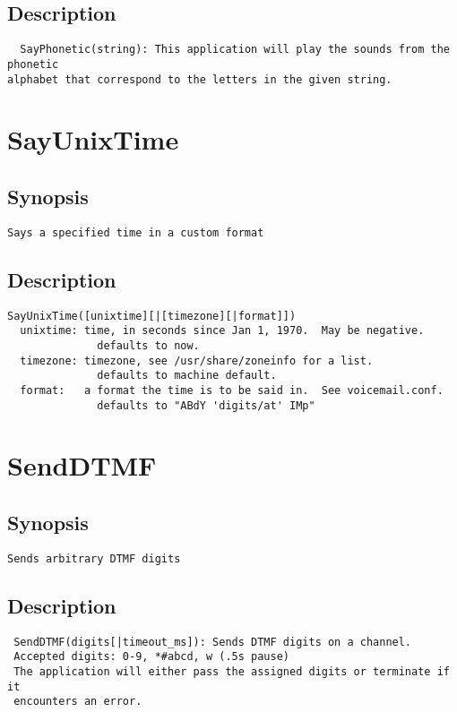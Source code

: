\subsection{Description}
\begin{verbatim}
  SayPhonetic(string): This application will play the sounds from the phonetic
alphabet that correspond to the letters in the given string.

\end{verbatim}


\section{SayUnixTime}
\subsection{Synopsis}
\begin{verbatim}
Says a specified time in a custom format
\end{verbatim}
\subsection{Description}
\begin{verbatim}
SayUnixTime([unixtime][|[timezone][|format]])
  unixtime: time, in seconds since Jan 1, 1970.  May be negative.
              defaults to now.
  timezone: timezone, see /usr/share/zoneinfo for a list.
              defaults to machine default.
  format:   a format the time is to be said in.  See voicemail.conf.
              defaults to "ABdY 'digits/at' IMp"

\end{verbatim}


\section{SendDTMF}
\subsection{Synopsis}
\begin{verbatim}
Sends arbitrary DTMF digits
\end{verbatim}
\subsection{Description}
\begin{verbatim}
 SendDTMF(digits[|timeout_ms]): Sends DTMF digits on a channel. 
 Accepted digits: 0-9, *#abcd, w (.5s pause)
 The application will either pass the assigned digits or terminate if it
 encounters an error.

\end{verbatim}


